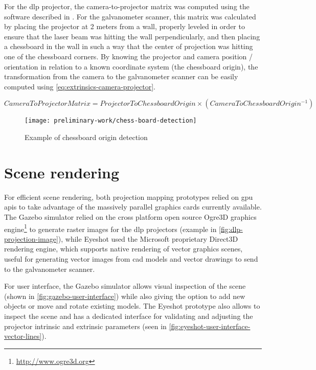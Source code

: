 For the \gls{dlp} projector, the camera-to-projector matrix was computed using the software described in \cite{Moreno2012}. For the galvanometer scanner, this matrix was calculated by placing the projector at 2 meters from a wall, properly leveled in order to ensure that the laser beam was hitting the wall perpendicularly, and then placing a chessboard in the wall in such a way that the center of projection was hitting one of the chessboard corners. By knowing the projector and camera position / orientation in relation to a known coordinate system (the chessboard origin), the transformation from the camera to the galvanometer scanner can be easily computed using \cref{eq:extrinsics-camera-projector}.

\begin{small}
	\begin{equation}\label{eq:extrinsics-camera-projector}
		CameraToProjectorMatrix = ProjectorToChessboardOrigin \times (CameraToChessboardOrigin^{-1})
	\end{equation}
\end{small}

\begin{figure}[H]
	\centering
	\texttt{[image: preliminary-work/chess-board-detection]}
	\caption{Example of chessboard origin detection}
	\label{fig:chess-board-detection}
\end{figure}



\section{Scene rendering}

For efficient scene rendering, both projection mapping prototypes relied on \gls{gpu} \glspl{api} to take advantage of the massively parallel graphics cards currently available. The Gazebo simulator relied on the cross platform open source Ogre3D graphics engine\footnote{\url{http://www.ogre3d.org}} to generate raster images for the \gls{dlp} projectors (example in \cref{fig:dlp-projection-image}), while Eyeshot used the Microsoft proprietary Direct3D rendering engine, which supports native rendering of vector graphics scenes, useful for generating vector images from \gls{cad} models and vector drawings to send to the galvanometer scanner.

For user interface, the Gazebo simulator allows visual inspection of the scene (shown in \cref{fig:gazebo-user-interface}) while also giving the option to add new objects or move and rotate existing models. The Eyeshot prototype also allows to inspect the scene and has a dedicated interface for validating and adjusting the projector intrinsic and extrinsic parameters (seen in \cref{fig:eyeshot-user-interface-vector-lines}).

